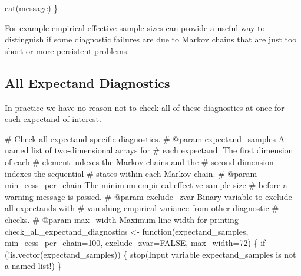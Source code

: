 \documentclass[
  letterpaper,
  DIV=11,
  numbers=noendperiod]{scrartcl}
\newenvironment{Shaded}{\begin{snugshade}}{\end{snugshade}}
\newcommand{\CommentTok}[1]{\textcolor[rgb]{0.37,0.37,0.37}{#1}}
\newcommand{\ControlFlowTok}[1]{\textcolor[rgb]{0.00,0.23,0.31}{#1}}
\newcommand{\DecValTok}[1]{\textcolor[rgb]{0.68,0.00,0.00}{#1}}
\newcommand{\KeywordTok}[1]{\textcolor[rgb]{0.00,0.23,0.31}{#1}}
\newcommand{\NormalTok}[1]{\textcolor[rgb]{0.00,0.23,0.31}{#1}}
\newcommand{\OperatorTok}[1]{\textcolor[rgb]{0.37,0.37,0.37}{#1}}
\newcommand{\StringTok}[1]{\textcolor[rgb]{0.13,0.47,0.30}{#1}}
\begin{document}
\begin{Shaded}
\begin{Highlighting}[]
\NormalTok{  cat(message)}
\NormalTok{\}}
\end{Highlighting}
\end{Shaded}

For example empirical effective sample sizes can provide a useful way to
distinguish if some diagnostic failures are due to Markov chains that
are just too short or more persistent problems.

\subsection{All Expectand Diagnostics}\label{all-expectand-diagnostics}

In practice we have no reason not to check all of these diagnostics at
once for each expectand of interest.

\begin{Shaded}
\begin{Highlighting}[]
\CommentTok{\# Check all expectand{-}specific diagnostics.}
\CommentTok{\# @param expectand\_samples A named list of two{-}dimensional arrays for }
\CommentTok{\#                          each expectand.  The first dimension of each}
\CommentTok{\#                          element indexes the Markov chains and the }
\CommentTok{\#                          second dimension indexes the sequential }
\CommentTok{\#                          states within each Markov chain.}
\CommentTok{\# @param min\_eess\_per\_chain The minimum empirical effective sample size}
\CommentTok{\#                           before a warning message is passed.}
\CommentTok{\# @param exclude\_zvar Binary variable to exclude all expectands with}
\CommentTok{\#                     vanishing empirical variance from other diagnostic}
\CommentTok{\#                     checks.}
\CommentTok{\# @param max\_width Maximum line width for printing}
\NormalTok{check\_all\_expectand\_diagnostics }\OperatorTok{\textless{}{-}}\NormalTok{ function(expectand\_samples,}
\NormalTok{                                            min\_eess\_per\_chain}\OperatorTok{=}\DecValTok{100}\NormalTok{,}
\NormalTok{                                            exclude\_zvar}\OperatorTok{=}\NormalTok{FALSE,}
\NormalTok{                                            max\_width}\OperatorTok{=}\DecValTok{72}\NormalTok{) \{}
  \ControlFlowTok{if}\NormalTok{ (}\OperatorTok{!}\KeywordTok{is}\NormalTok{.vector(expectand\_samples)) \{}
\NormalTok{    stop(}\StringTok{\textquotesingle{}Input variable \textasciigrave{}expectand\_samples\textasciigrave{} is not a named list!\textquotesingle{}}\NormalTok{)}
\NormalTok{  \}}
  

\end{Highlighting}
\end{Shaded}
\end{document}
